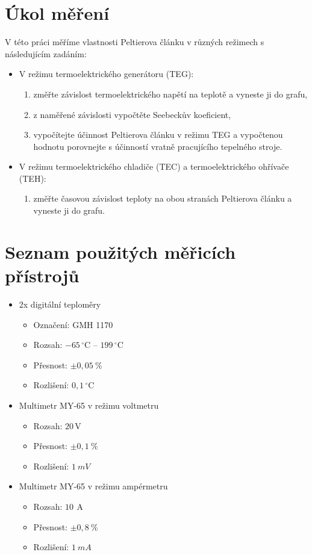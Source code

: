 \documentclass[a4paper,12pt]{article}
\newcommand{\unitC}{\,^\circ\mathrm{C}}
\newcommand{\unitV}{\,\mathrm{V}}
\newcommand{\unitA}{\,\mathrm{A}}
\begin{document}
\section{Úkol měření}
V této práci měříme vlastnosti Peltierova článku v různých režimech s následujícím zadáním:
\begin{itemize}
\item V režimu termoelektrického generátoru (TEG):
\begin{enumerate}
    \item změřte závislost termoelektrického napětí na teplotě a vyneste ji do grafu,
    \item z naměřené závislosti vypočtěte Seebeckův koeficient,
    \item vypočítejte účinnost Peltierova článku v režimu TEG a vypočtenou hodnotu porovnejte s účinností vratně pracujícího tepelného stroje.
\end{enumerate}

\item V režimu termoelektrického chladiče (TEC) a termoelektrického ohřívače (TEH):
\begin{enumerate}
    \item změřte časovou závislost teploty na obou stranách Peltierova článku a vyneste ji do grafu.
\end{enumerate}
\end{itemize}

\section{Seznam použitých měřicích přístrojů}
\begin{itemize}
    \item 2x digitální teploměry
        \begin{itemize}
            \item Označení: GMH 1170
            \item Rozsah: $-65\unitC$ -- $199\unitC$
            \item Přesnost: $\pm 0,05\ \%$
            \item Rozlišení: $0,1\unitC$
        \end{itemize}
    \item Multimetr MY-65 v režimu voltmetru
        \begin{itemize}
            \item Rozsah: $20\unitV$
            \item Přesnost: $\pm 0,1\ \%$
            \item Rozlišení: $1\ \unit{mV}$
        \end{itemize}
    \item Multimetr MY-65 v režimu ampérmetru
        \begin{itemize}
            \item Rozsah: $10\ \unitA$
            \item Přesnost: $\pm 0,8\ \%$
            \item Rozlišení: $1\ \unit{mA}$
        \end{itemize}
\end{itemize}
\end{document}
